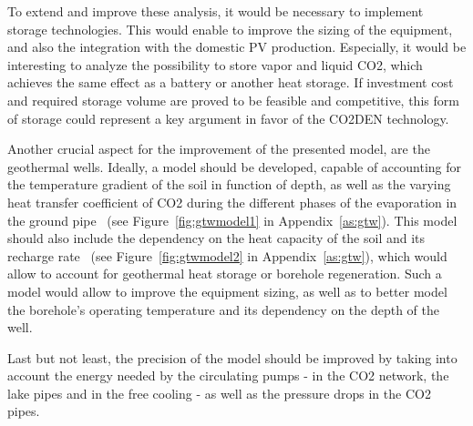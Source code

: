 \documentclass{article}
\begin{document}
To extend and improve these analysis, it would be necessary to implement storage technologies. This would enable to improve the sizing of the equipment, and also the integration with the domestic PV production. Especially, it would be interesting to analyze the possibility to store vapor and liquid CO2, which achieves the same effect as a battery or another heat storage. If investment cost and required storage volume are proved to be feasible and competitive, this form of storage could represent a key argument in favor of the CO2DEN technology.

Another crucial aspect for the improvement of the presented model, are the geothermal wells. 
Ideally, a model should be developed, capable of accounting for the temperature gradient of the soil in function of depth, as well as the varying heat transfer coefficient of CO2 during the different phases of the evaporation in the ground pipe~\cite{badacheExperimentalStudyCarbon2018,lamarcheReviewMethodsEvaluate2010} (see Figure~\ref{fig:gtwmodel1} in Appendix~\ref{as:gtw}).
This model should also include the dependency on the heat capacity of the soil and its recharge rate~\cite{jiaReviewEffectiveThermal2019,lamarcheReviewMethodsEvaluate2010,zengHeatTransferAnalysis2003} (see Figure~\ref{fig:gtwmodel2} in Appendix~\ref{as:gtw}), which would allow to account for geothermal heat storage or borehole regeneration.
Such a model would allow to improve the equipment sizing, as well as to better model the borehole's operating temperature and its dependency on the depth of the well.

Last but not least, the precision of the model should be improved by taking into account the energy needed by the circulating pumps - in the CO2 network, the lake pipes and in the free cooling - as well as the pressure drops in the CO2 pipes.
 

\clearpage


\clearpage
\appendix	



\end{document}
